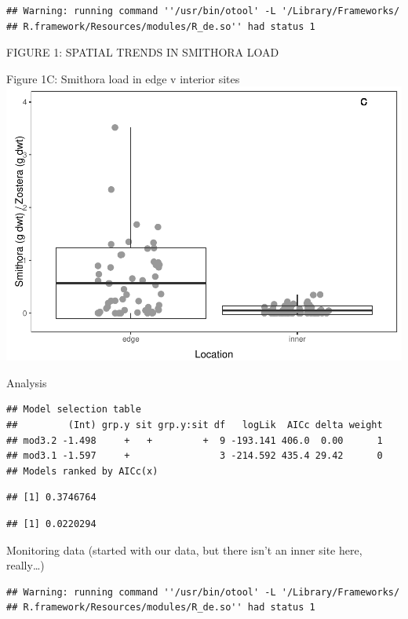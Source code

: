 \documentclass[]{article}
\begin{document}
\begin{verbatim}
## Warning: running command ''/usr/bin/otool' -L '/Library/Frameworks/
## R.framework/Resources/modules/R_de.so'' had status 1
\end{verbatim}

FIGURE 1: SPATIAL TRENDS IN SMITHORA LOAD

Figure 1C: Smithora load in edge v interior sites\\
\includegraphics{Griffiths_et_al_analyses_and_figures_files/figure-latex/unnamed-chunk-4-1.pdf}

Analysis

\begin{verbatim}
## Model selection table 
##         (Int) grp.y sit grp.y:sit df   logLik  AICc delta weight
## mod3.2 -1.498     +   +         +  9 -193.141 406.0  0.00      1
## mod3.1 -1.597     +                3 -214.592 435.4 29.42      0
## Models ranked by AICc(x)
\end{verbatim}

\begin{verbatim}
## [1] 0.3746764
\end{verbatim}

\begin{verbatim}
## [1] 0.0220294
\end{verbatim}

Monitoring data (started with our data, but there isn't an inner site
here, really\ldots{})

\begin{verbatim}
## Warning: running command ''/usr/bin/otool' -L '/Library/Frameworks/
## R.framework/Resources/modules/R_de.so'' had status 1
\end{verbatim}
\end{document}
